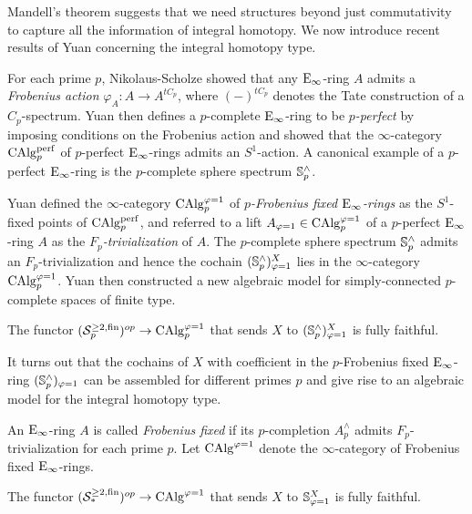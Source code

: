 Mandell's theorem suggests that we need structures beyond just commutativity to capture all the information of integral homotopy.
We now introduce recent results of Yuan \cite{Yuan} concerning the integral homotopy type.

For each prime $p$, Nikolaus-Scholze \cite{Nikolaus-Scholze} showed that any $\operatorname{E}_{\infty}$-ring $A$ admits a \emph{Frobenius action} $\varphi_{A}:A \to A^{tC_{p}}$, where $(-)^{tC_p}$ denotes the Tate construction of a $C_p$-spectrum.
Yuan \cite{Yuan} then defines a $p$-complete $\operatorname{E}_\infty$-ring to be \emph{$p$-perfect} by imposing conditions on the Frobenius action and showed that the $\infty$-category $\operatorname{CAlg}_p^{\operatorname{perf}}$ of $p$-perfect $\operatorname{E}_\infty$-rings
admits an $S^1$-action.
A canonical example of a $p$-perfect $\operatorname{E}_{\infty}$-ring is the $p$-complete sphere spectrum ${\mathbb{S}}^{\wedge}_p$.

Yuan defined the $\infty$-category $\operatorname{CAlg}_{p}^{\varphi=1}$ of \emph{$p$-Frobenius fixed $\operatorname{E}_{\infty}$-rings} as the $S^1$-fixed points of $\operatorname{CAlg}_p^{\operatorname{perf}}$, and referred to a lift $A_{\varphi=1}\in \operatorname{CAlg}_{p}^{\varphi=1}$ of a
$p$-perfect $\operatorname{E}_{\infty}$-ring $A$ as the \emph{$F_p$-trivialization} of $A$.
The $p$-complete sphere spectrum ${\mathbb{S}}^{\wedge}_p$ admits an $F_p$-trivialization and hence the cochain $({\mathbb{S}}^{\wedge}_{p})_{\varphi=1}^{X}$ lies in the $\infty$-category $\operatorname{CAlg}_{p}^{\varphi=1} $.
Yuan then constructed a new algebraic model for simply-connected $p$-complete spaces of finite type.
\begin{theorem}
    \cite[Theorem B]{Yuan}
    The functor $
    ({\mathcal{S}}^{\geq 2, \operatorname{fin}}_p)^{op} 
    \to 
    \operatorname{CAlg}_{p}^{\varphi=1} 
    $ that sends $X$ to $({\mathbb{S}}^{\wedge}_{p})_{\varphi=1}^{X}$ is fully faithful.
\end{theorem}

It turns out that the cochains of $X$ with coefficient in the $p$-Frobenius fixed $\operatorname{E}_\infty$-ring $({\mathbb{S}}^{\wedge}_{p})_{\varphi=1}$ can be assembled for different primes $p$ and give rise to an algebraic model for the integral homotopy type.

An $\operatorname{E}_{\infty}$-ring $A$ is called \emph{Frobenius fixed} if its $p$-completion $A^{\wedge}_{p}$ admits $F_p$-trivialization for each prime $p$. Let $\operatorname{CAlg}^{\varphi=1}$ denote the $\infty$-category of Frobenius fixed $\operatorname{E}_\infty$-rings.
\begin{theorem}
    \cite[Theorem C]{Yuan}
    The functor $
    ({\mathcal{S}}_{*}^{\geq 2, \operatorname{fin}})^{op} 
    \to 
    \operatorname{CAlg}^{\varphi=1} 
    $ that sends $X$ to ${\mathbb{S}}_{\varphi=1}^{X}$ is fully faithful.
\end{theorem}

